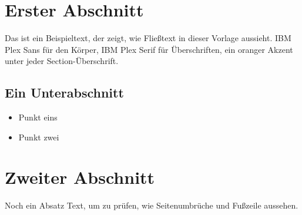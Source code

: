 \documentclass[11pt]{article}
\begin{document}

\section{Erster Abschnitt}
Das ist ein Beispieltext, der zeigt, wie Fließtext in dieser Vorlage aussieht.
IBM Plex Sans für den Körper, IBM Plex Serif für Überschriften, ein oranger Akzent
unter jeder Section-Überschrift.

\subsection{Ein Unterabschnitt}
\begin{itemize}
  \item Punkt eins
  \item Punkt zwei
\end{itemize}

\section{Zweiter Abschnitt}
Noch ein Absatz Text, um zu prüfen, wie Seitenumbrüche und Fußzeile aussehen.
\end{document}
